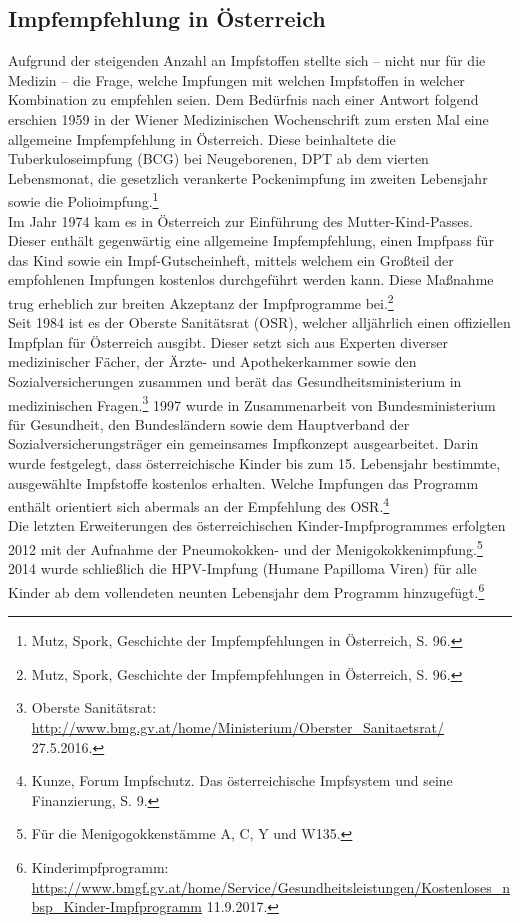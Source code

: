 \documentclass[
    a4paper,
    12pt,
    hyphens,
    chapterprefix=true,
    headheight=33pt,
    footheight=29pt,
    headings=optiontohead,
]{scrartcl}
\begin{document}
\subsection{Impfempfehlung in Österreich}
Aufgrund der steigenden Anzahl an Impfstoffen stellte sich -- nicht nur für die Medizin -- die Frage, welche Impfungen mit welchen
Impfstoffen in welcher Kombination zu empfehlen seien. Dem Bedürfnis nach einer Antwort folgend erschien 1959 in der Wiener Medizinischen Wochenschrift
zum ersten Mal eine allgemeine Impfempfehlung in Österreich. Diese beinhaltete die Tuberkuloseimpfung (BCG) bei Neugeborenen, DPT ab
dem vierten Lebensmonat, die gesetzlich verankerte Pockenimpfung im zweiten Lebensjahr sowie die Polioimpfung.\footnote{Mutz, Spork,
Geschichte der Impfempfehlungen in Österreich, S. 96.}\\
Im Jahr 1974 kam es in Österreich zur Einführung des Mutter-Kind-Passes. Dieser enthält gegenwärtig
eine allgemeine Impfempfehlung, einen Impfpass für das Kind sowie ein Impf-Gutscheinheft, mittels welchem ein Großteil der empfohlenen
Impfungen kostenlos durchgeführt werden kann. Diese Maßnahme trug erheblich zur breiten Akzeptanz der Impfprogramme bei.\footnote{Mutz, Spork, Geschichte der Impfempfehlungen in Österreich, S. 96.} \\
Seit 1984 ist es der Oberste Sanitätsrat (OSR), welcher alljährlich einen offiziellen Impfplan für Österreich ausgibt. Dieser setzt sich aus Experten diverser medizinischer Fächer, der Ärzte- und Apothekerkammer sowie den Sozialversicherungen
zusammen und berät das Gesundheitsministerium in medizinischen Fragen.\footnote{Oberste Sanitätsrat: \url{http://www.bmg.gv.at/home/Ministerium/Oberster_Sanitaetsrat/} 27.5.2016.}
1997 wurde in Zusammenarbeit von Bundesministerium für Gesundheit, den Bundesländern sowie dem Hauptverband der Sozialversicherungsträger
ein gemeinsames Impfkonzept ausgearbeitet. Darin wurde festgelegt, dass österreichische Kinder bis zum 15. Lebensjahr bestimmte,
ausgewählte Impfstoffe kostenlos erhalten. Welche Impfungen das Programm enthält orientiert sich abermals an der Empfehlung des
OSR.\footnote{Kunze, Forum Impfschutz. Das österreichische Impfsystem und seine Finanzierung, S. 9.}\\
Die letzten Erweiterungen des österreichischen Kinder-Impfprogrammes erfolgten 2012 mit der Aufnahme der Pneumokokken- und der
Menigokokkenimpfung.\footnote{Für die Menigogokkenstämme A, C, Y und W135.} 2014 wurde schließlich die HPV-Impfung
(Humane Papilloma Viren) für alle Kinder ab dem vollendeten neunten Lebensjahr dem Programm hinzugefügt.\footnote{Kinderimpfprogramm: \url{https://www.bmgf.gv.at/home/Service/Gesundheitsleistungen/Kostenloses_nbsp_Kinder-Impfprogramm} 11.9.2017.}
\end{document}
